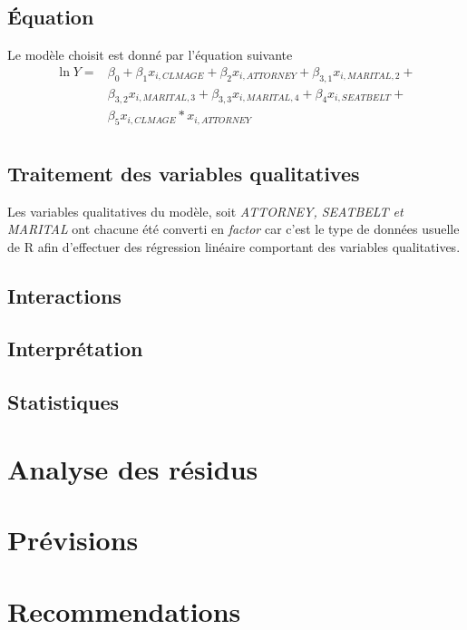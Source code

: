 \documentclass{article}\usepackage[]{graphicx}\usepackage[]{color}
\begin{document}
\subsection{Équation}
\label{ssec:equation}
Le modèle choisit est donné par l'équation suivante
$$
\begin{aligned}
\ln Y  = & \beta_0 + \beta_1x_{i,CLMAGE} + \beta_2x_{i,ATTORNEY} + \beta_{3,1}x_{i,MARITAL,2} + \\ 
& \beta_{3,2}x_{i,MARITAL,3} + \beta_{3,3}x_{i,MARITAL,4} + \beta_4x_{i,SEATBELT} + \\ 
& \beta_5x_{i,CLMAGE}*
x_{i,ATTORNEY}\\
\end{aligned}
$$
\subsection{Traitement des variables qualitatives}
\label{ssec:var_qual}
Les variables qualitatives du modèle, soit \textit{ATTORNEY, SEATBELT et MARITAL} ont chacune
été converti en \textit{factor} car c'est le type de données usuelle de R afin d'effectuer des
régression linéaire comportant des variables qualitatives.
\subsection{Interactions}
\label{ssec:interaction}

\subsection{Interprétation}
\label{ssec:interpretation}

\subsection{Statistiques}
\label{ssec:stats}

\section{Analyse des résidus}
\label{sec:analyse}

\section{Prévisions}
\label{sec:prev}

\section{Recommendations}
\end{document}
